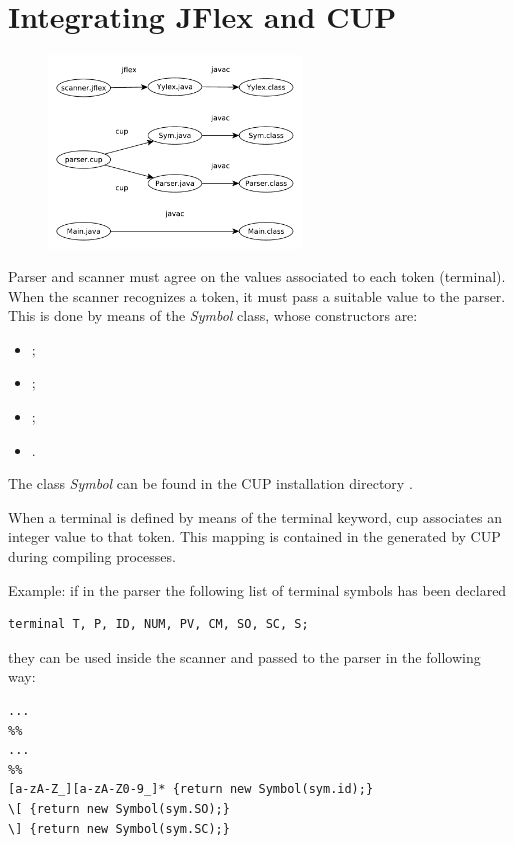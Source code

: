 \section{Integrating JFlex and CUP}
\begin{figure}[H]
    \centerline{\includegraphics[width=0.6\textwidth]{img/19.pdf}}
\end{figure}

Parser and scanner must agree on the values associated to each token (terminal).
When the scanner recognizes a token, it must pass a suitable value to the parser.
This is done by means of the \emph{Symbol} class, whose constructors are:
\begin{itemize}
    \item
    ;
    \item
    ;
    \item
    ;
    \item
    .
\end{itemize}
The class \emph{Symbol} can be found in the CUP installation directory .

When a terminal is defined by means of the terminal keyword, cup associates an integer value to that token.
This mapping is contained in the  generated by CUP during compiling processes.

Example: if in the parser the following list of terminal symbols has been declared
\begin{lstlisting}
terminal T, P, ID, NUM, PV, CM, SO, SC, S;
\end{lstlisting}
they can be used inside the scanner and passed to the parser in the following way:
\begin{lstlisting}[frame=single]
...
%%
...
%%
[a-zA-Z_][a-zA-Z0-9_]* {return new Symbol(sym.id);}
\[ {return new Symbol(sym.SO);}
\] {return new Symbol(sym.SC);}
\end{lstlisting}


